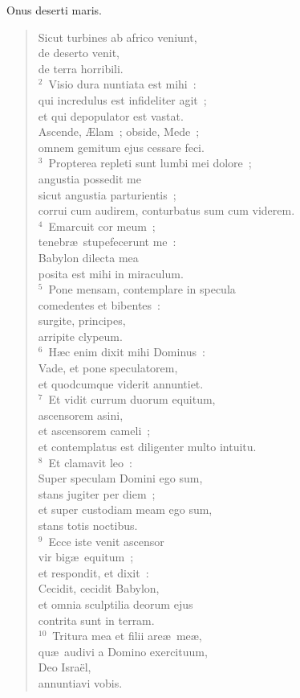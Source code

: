 \lettrine[lines=3,image=true,loversize=0.05,lraise=-0.03]{O}{}nus deserti maris. \begin{flushleft}\begin{verse}\vspace{6pt}Sicut turbines ab africo veniunt,\\ de deserto venit,\\ de terra horribili.\\
${}^{2}$~Visio dura nuntiata est mihi~:\\ qui incredulus est infideliter agit~;\\ et qui depopulator est vastat.\\ Ascende, \AE lam~; obside, Mede~;\\ omnem gemitum ejus cessare feci.\\
${}^{3}$~Propterea repleti sunt lumbi mei dolore~;\\ angustia possedit me\\ sicut angustia parturientis~;\\ corrui cum audirem, conturbatus sum cum viderem.\\
${}^{4}$~Emarcuit cor meum~;\\ tenebr\ae\ stupefecerunt me~:\\ Babylon dilecta mea\\ posita est mihi in miraculum.\\
${}^{5}$~Pone mensam, contemplare in specula\\ comedentes et bibentes~:\\ surgite, principes,\\ arripite clypeum.\\
${}^{6}$~H\ae c enim dixit mihi Dominus~:\\ Vade, et pone speculatorem,\\ et quodcumque viderit annuntiet.\\
${}^{7}$~Et vidit currum duorum equitum,\\ ascensorem asini,\\ et ascensorem cameli~;\\ et contemplatus est diligenter multo intuitu.\\
${}^{8}$~Et clamavit leo~:\\ Super speculam Domini ego sum,\\ stans jugiter per diem~;\\ et super custodiam meam ego sum,\\ stans totis noctibus.\\
${}^{9}$~Ecce iste venit ascensor\\ vir big\ae\ equitum~;\\ et respondit, et dixit~:\\ Cecidit, cecidit Babylon,\\ et omnia sculptilia deorum ejus\\ contrita sunt in terram.\\
${}^{10}$~Tritura mea et filii are\ae\ me\ae ,\\ qu\ae\ audivi a Domino exercituum,\\ Deo Isra\"el,\\ annuntiavi vobis.\end{verse}\end{flushleft}


